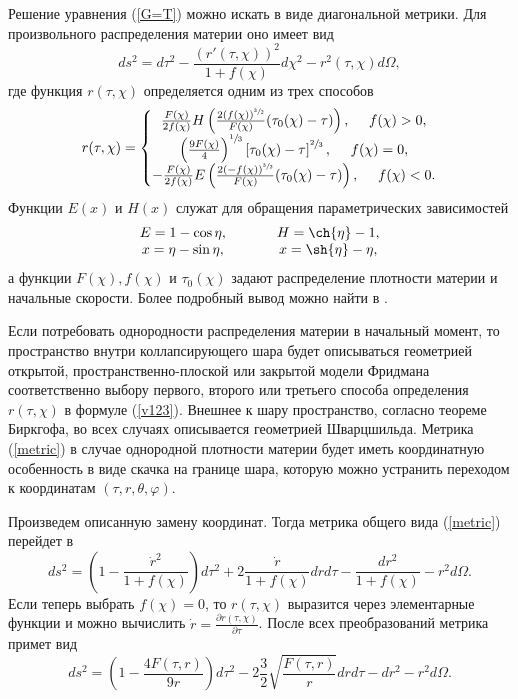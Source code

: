 \documentclass[12pt]{article}
\newcommand{\bq}{\begin{equation}}
\newcommand{\eq}{\end{equation}}
\begin{document}
Решение уравнения (\ref{G=T}) можно искать в виде диагональной метрики. Для произвольного распределения материи оно имеет вид
\bq
\label{metric}
	d s^2 = d \tau^2 - \frac{(r'(\tau, \chi))^2}{1+f(\chi)} d\chi^2 - r^2(\tau, \chi) d \Omega,
\eq
где функция $r(\tau, \chi)$ определяется одним из трех способов
\bq
\label{v123}
	r(\tau, \chi) = \left\{
	\begin{matrix}
	\frac{F(\chi)}{2 f(\chi)} H \left( \frac{2(f(\chi))^{\sfrac{3}{2}} }{F(\chi)}(\tau_0(\chi)-\tau)  \right) , \ \ \ \ f(\chi) > 0,\\
	\left( \frac{9F(\chi)}{4} \right)^{\sfrac{1}{3}} \left[ \tau_0(\chi)- \tau \right]^{\sfrac{2}{3}}, \ \ \ \ f(\chi) = 0, \\
	- \frac{F(\chi)}{2 f(\chi)} E \left( \frac{2(-f(\chi))^{\sfrac{3}{2}} }{F(\chi)}(\tau_0(\chi)-\tau) \right), \ \ \ \ f(\chi) < 0.  
	\end{matrix} \right.
\eq
Функции $E(x)$ и $H(x)$  служат для обращения параметрических зависимостей
\bq
	\begin{array}{c}
	E = 1 - \cos{\eta}, \\
	x = \eta - \sin{\eta},
	\end{array} \ \ \ \ \ \ \ \
	\begin{array}{c}
	H = \ch{\eta}-1, \\
	x = \sh{\eta} - \eta,
	\end{array}
\eq
а функции $F(\chi), f(\chi)$ и $\tau_0(\chi)$ задают распределение плотности материи и начальные скорости. Более подробный вывод можно найти в \cite{landavshic2}.

Если потребовать однородности распределения материи в начальный момент, то пространство внутри коллапсирующего шара будет описываться геометрией открытой, пространственно-плоской или закрытой модели Фридмана соответственно выбору первого, второго или третьего способа определения $r(\tau, \chi)$ в формуле (\ref{v123}). Внешнее к шару пространство, согласно теореме Биркгофа, во всех случаях описывается геометрией Шварцшильда. Метрика (\ref{metric}) в случае однородной плотности материи будет иметь координатную особенность в виде скачка на границе шара, которую можно устранить переходом к координатам $(\tau, r, \theta, \varphi)$. 

Произведем описанную замену координат. Тогда метрика общего вида (\ref{metric}) перейдет в 
\bq
	d s^2 = \left( 1- \frac{\dot{r}^2}{1+f(\chi)}\right) d \tau^2 + 2\frac{\dot{r}}{1+f(\chi)}dr d\tau - \frac{dr^2}{1+f(\chi)} - r^2 d\Omega.
\eq
Если теперь выбрать $f(\chi)=0$, то $r(\tau, \chi)$ выразится через элементарные функции и можно вычислить $\dot{r} = \frac{\partial r(\tau, \chi)}{\partial \tau}$. После всех преобразований метрика примет вид
\bq
\label{metric2}
	d s^2 = \left(1-\frac{4F(\tau, r)}{9 r} \right)d\tau^2 - 2 \frac{3}{2}\sqrt{\frac{F(\tau, r)}{r}}dr d\tau  - dr^2 - r^2 d\Omega.
\eq
\end{document}

